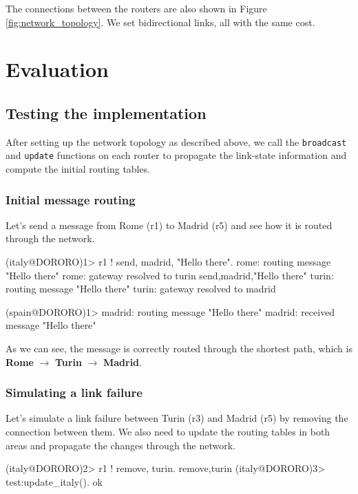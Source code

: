 \documentclass[a4paper, 11pt]{article}
\begin{document}
The connections between the routers are also shown in Figure \ref{fig:network_topology}. We set bidirectional links, all with the same cost.

\section{Evaluation}

\subsection{Testing the implementation}
After setting up the network topology as described above, we call the \texttt{broadcast} and \texttt{update} functions on each router to propagate the link-state information and compute the initial routing tables. 

\subsubsection{Initial message routing}

Let's send a message from Rome (r1) to Madrid (r5) and see how it is routed through the network.

\begin{mylisting}
(italy@DORORO)1> r1 ! {send, madrid, "Hello there"}.
rome: routing message "Hello there"
rome: gateway resolved to turin
{send,madrid,"Hello there"}
turin: routing message "Hello there"
turin: gateway resolved to madrid
\end{mylisting}



\begin{mylisting}
(spain@DORORO)1> madrid: routing message "Hello there"
madrid: received message "Hello there"
\end{mylisting}

As we can see, the message is correctly routed through the shortest path, which is \textbf{Rome} $\to$ \textbf{Turin} $\to$ \textbf{Madrid}.

\subsubsection{Simulating a link failure}

Let's simulate a link failure between Turin (r3) and Madrid (r5) by removing the connection between them. We also need to update the routing tables in both areas and propagate the changes through the network.


\begin{mylisting}
(italy@DORORO)2> r1 ! {remove, turin}.
{remove,turin}
(italy@DORORO)3> test:update_italy().
ok
\end{mylisting}
\end{document}

